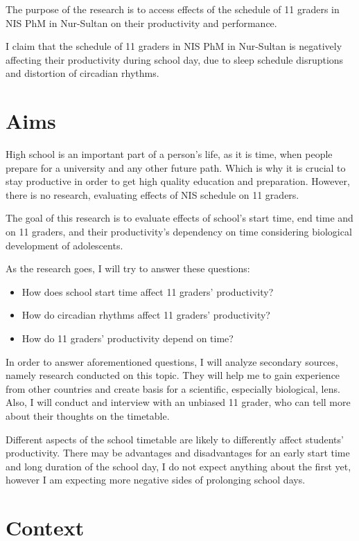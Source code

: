 \documentclass[12pt,a4paper,stu, donotrepeattitle, floatsintext]{apa7}
\begin{document}
The purpose of the research is to access effects of the schedule of 11 graders in NIS PhM in Nur-Sultan on their productivity and performance. 

I claim that the schedule of 11 graders in NIS PhM in Nur-Sultan is negatively affecting their productivity during school day, due to sleep schedule disruptions and distortion of circadian rhythms.

\newpage
\section{Aims}

High school is an important part of a person’s life, as it is time, when people prepare for a university and any other future path. Which is why it is crucial to stay productive in order to get high quality education and preparation. However, there is no research, evaluating effects of NIS schedule on 11 graders.

The goal of this research is to evaluate effects of school’s start time, end time and on 11 graders, and their productivity’s dependency on time considering biological development of adolescents.

As the research goes, I will try to answer these questions:

\begin{itemize}
    \item How does school start time affect 11 graders’ productivity?
    \item How do circadian rhythms affect 11 graders’ productivity?
    \item How do 11 graders’ productivity depend on time?
\end{itemize}

In order to answer aforementioned questions, I will analyze secondary sources, namely research conducted on this topic. They will help me to gain experience from other countries and create basis for a scientific, especially biological, lens. Also, I will conduct and interview with an unbiased 11 grader, who can tell more about their thoughts on the timetable.

Different aspects of the school timetable are likely to differently affect students’ productivity. There may be advantages and disadvantages for an early start time and long duration of the school day, I do not expect anything about the first yet, however I am expecting more negative sides of prolonging school days.

\section {Context}
\end{document}

